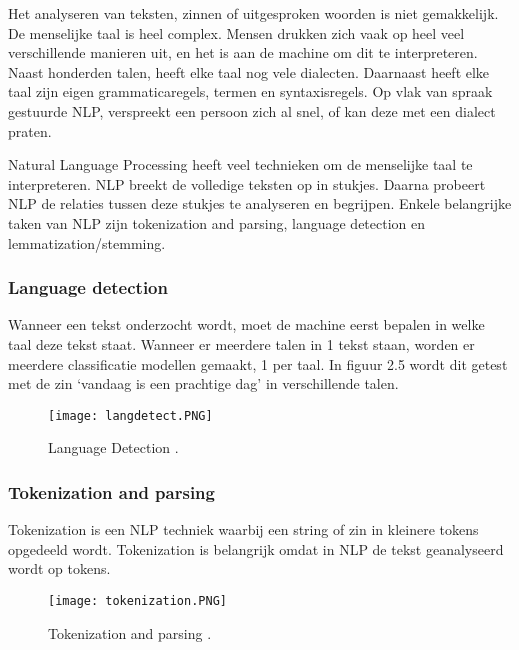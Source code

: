 Het analyseren van teksten, zinnen of uitgesproken woorden is niet gemakkelijk. De menselijke taal is heel complex. Mensen drukken zich vaak op heel veel verschillende manieren uit, en het is aan de machine om dit te interpreteren. Naast honderden talen, heeft elke taal nog vele dialecten. Daarnaast heeft elke taal zijn eigen grammaticaregels, termen en syntaxisregels.
Op vlak van spraak gestuurde NLP, verspreekt een persoon zich al snel, of kan deze met een dialect praten. \autocite{sas2020}

Natural Language Processing heeft veel technieken om de menselijke taal te interpreteren. NLP breekt de volledige teksten op in stukjes. Daarna probeert NLP de relaties tussen deze stukjes te analyseren en begrijpen. Enkele belangrijke taken van NLP zijn tokenization and parsing, language detection en lemmatization/stemming. \autocite{sas2020}

\subsubsection{Language detection}
\label{sec:Languagedetection}

Wanneer een tekst onderzocht wordt, moet de machine eerst bepalen in welke taal deze tekst staat. Wanneer er meerdere talen in 1 tekst staan, worden er meerdere classificatie modellen gemaakt, 1 per taal. In figuur 2.5 wordt dit getest met de zin ‘vandaag is een prachtige dag' in verschillende talen. 

\begin{figure}[!htbp]
    \texttt{[image: langdetect.PNG]}
    \caption{\label{languagedetection}Language Detection \autocite{sas2020}.}
\end{figure}
\FloatBarrier

\subsubsection{Tokenization and parsing}
\label{sec:Tokenization}

Tokenization is een NLP techniek waarbij een string of zin in kleinere tokens opgedeeld wordt. Tokenization is belangrijk omdat in NLP de tekst geanalyseerd wordt op tokens. 

\begin{figure}[!htbp]
    \texttt{[image: tokenization.PNG]}
    \caption{\label{tokenization}Tokenization and parsing \autocite{sas2020}.}
\end{figure}
\FloatBarrier


